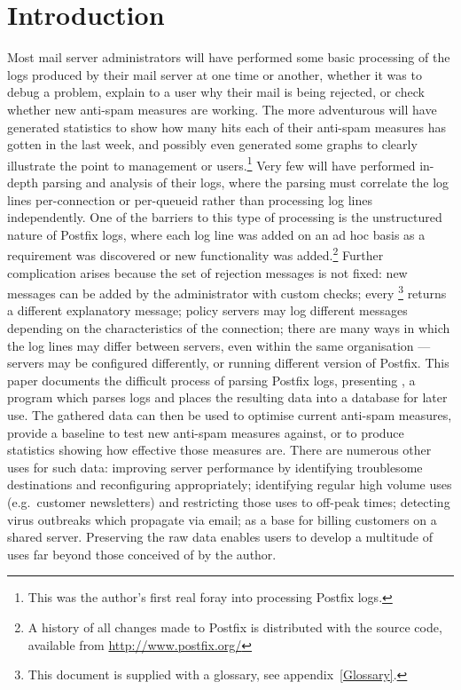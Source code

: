 \documentclass[a4paper,12pt,draft]{article}
\begin{document}
\newpage
\tableofcontents
\listoffigures
\listoftables

\newpage
\section{Introduction}

\label{introduction}

Most mail server administrators will have performed some basic processing
of the logs produced by their mail server at one time or another, whether
it was to debug a problem, explain to a user why their mail is being
rejected, or check whether new anti-spam measures are working.  The more
adventurous will have generated statistics to show how many hits each of
their anti-spam measures has gotten in the last week, and possibly even
generated some graphs to clearly illustrate the point to management or
users.\footnote{This was the author's first real foray into processing
Postfix logs.}  Very few will have performed in-depth parsing and analysis
of their logs, where the parsing must correlate the log lines
per-connection or per-queueid rather than processing log lines
independently.  One of the barriers to this type of processing is the
unstructured nature of Postfix logs, where each log line was added on an ad
hoc basis as a requirement was discovered or new functionality was
added.\footnote{A history of all changes made to Postfix is distributed
with the source code, available from \url{http://www.postfix.org/}} Further
complication arises because the set of rejection messages is not fixed: new
messages can be added by the administrator with custom checks; every
\RBL{}\footnote{This document is supplied with a glossary, see
appendix~\ref{Glossary}.} returns a different explanatory message; policy
servers may log different messages depending on the characteristics of the
connection; there are many ways in which the log lines may differ between
servers, even within the same organisation --- servers may be configured
differently, or running different version of Postfix.  This paper documents
the difficult process of parsing Postfix logs, presenting \PLP{}, a program
which parses logs and places the resulting data into a database for later
use.  The gathered data can then be used to optimise current anti-spam
measures, provide a baseline to test new anti-spam measures against, or to
produce statistics showing how effective those measures are.  There are
numerous other uses for such data: improving server performance by
identifying troublesome destinations and reconfiguring appropriately;
identifying regular high volume uses (e.g.\ customer newsletters) and
restricting those uses to off-peak times; detecting virus outbreaks which
propagate via email; as a base for billing customers on a shared server.
Preserving the raw data enables users to develop a multitude of uses far
beyond those conceived of by the author.
\end{document}
